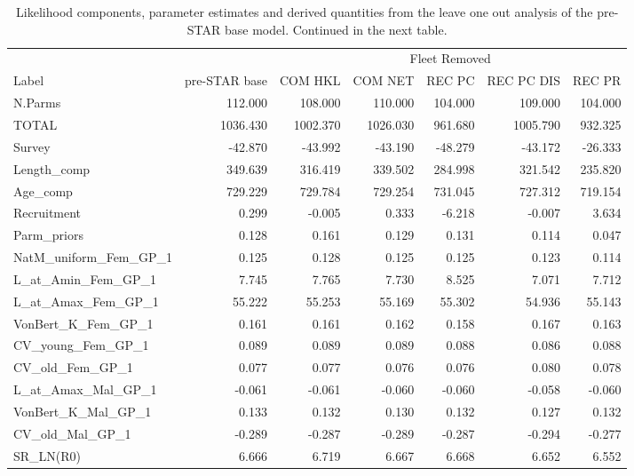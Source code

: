\documentclass[11pt,
  english,
]{article}
\begin{document}
\FloatBarrier

\begin{landscape}\begin{table}

\caption{\label{tab:drop-one}Likelihood components, parameter estimates and derived quantities from the leave one out analysis of the pre-STAR base model. Continued in the next table.}
\centering
\begin{tabular}[t]{lrrrrrr}
\toprule
\multicolumn{2}{c}{ } & \multicolumn{5}{c}{Fleet Removed} \\
\cmidrule(l{3pt}r{3pt}){3-7}
Label & pre-STAR base & COM HKL & COM NET & REC PC & REC PC DIS & REC PR\\
\midrule
N.Parms & 112.000 & 108.000 & 110.000 & 104.000 & 109.000 & 104.000\\
TOTAL & 1036.430 & 1002.370 & 1026.030 & 961.680 & 1005.790 & 932.325\\
Survey & -42.870 & -43.992 & -43.190 & -48.279 & -43.172 & -26.333\\
Length\_comp & 349.639 & 316.419 & 339.502 & 284.998 & 321.542 & 235.820\\
Age\_comp & 729.229 & 729.784 & 729.254 & 731.045 & 727.312 & 719.154\\
Recruitment & 0.299 & -0.005 & 0.333 & -6.218 & -0.007 & 3.634\\
Parm\_priors & 0.128 & 0.161 & 0.129 & 0.131 & 0.114 & 0.047\\
NatM\_uniform\_Fem\_GP\_1 & 0.125 & 0.128 & 0.125 & 0.125 & 0.123 & 0.114\\
L\_at\_Amin\_Fem\_GP\_1 & 7.745 & 7.765 & 7.730 & 8.525 & 7.071 & 7.712\\
L\_at\_Amax\_Fem\_GP\_1 & 55.222 & 55.253 & 55.169 & 55.302 & 54.936 & 55.143\\
VonBert\_K\_Fem\_GP\_1 & 0.161 & 0.161 & 0.162 & 0.158 & 0.167 & 0.163\\
CV\_young\_Fem\_GP\_1 & 0.089 & 0.089 & 0.089 & 0.088 & 0.086 & 0.088\\
CV\_old\_Fem\_GP\_1 & 0.077 & 0.077 & 0.076 & 0.076 & 0.080 & 0.078\\
L\_at\_Amax\_Mal\_GP\_1 & -0.061 & -0.061 & -0.060 & -0.060 & -0.058 & -0.060\\
VonBert\_K\_Mal\_GP\_1 & 0.133 & 0.132 & 0.130 & 0.132 & 0.127 & 0.132\\
CV\_old\_Mal\_GP\_1 & -0.289 & -0.287 & -0.289 & -0.287 & -0.294 & -0.277\\
SR\_LN(R0) & 6.666 & 6.719 & 6.667 & 6.668 & 6.652 & 6.552\\

\end{tabular}
\end{table}
\end{landscape}
\end{document}
